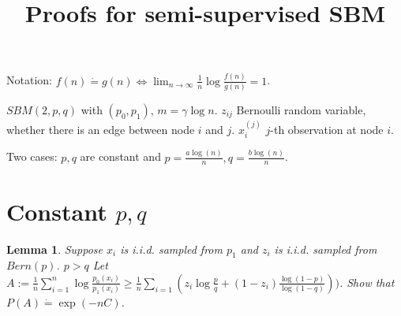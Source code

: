 \documentclass{article}
\title{Proofs for semi-supervised SBM}
\newtheorem{lemma}{Lemma}
\newcommand{\A}{\frac{a \log(n)}{n}}
\newcommand{\B}{\frac{b \log(n)}{n}}
\begin{document}
\maketitle
Notation: $f(n)\dot{=} g(n) \iff \lim_{n\to \infty} \frac{1}{n} \log \frac{f(n)}{g(n)} = 1$.

$SBM(2, p, q)$ with $(p_0, p_1)$, $m=\gamma \log n$. $z_{ij}$ Bernoulli random variable, whether there is an edge between node $i$ and $j$.
$x^{(j)}_{i}$ $j$-th observation at node $i$.

Two cases: $p,q$ are constant and $p=\A, q = \B$.

\section{Constant $p,q$}
\begin{lemma}\label{lem:coupled}
	Suppose $x_i$ is i.i.d. sampled from $p_1$ and $z_i$ is i.i.d. sampled from $Bern(p)$.
	$p > q$
Let $A := \frac{1}{n}\sum_{i=1}^n \log \frac{p_0(x_i)}{p_1(x_i)} \geq \frac{1}{n} \sum_{i=1}(z_i \log\frac{p}{q} +(1-z_i) \frac{\log(1-p)}{\log(1-q)}))$.
Show that $P(A) \dot{=} \exp(-n C)$.
\end{lemma}
\end{document}
